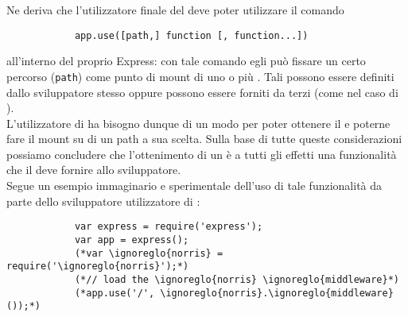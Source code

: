 		Ne deriva che l'utilizzatore finale del  deve poter utilizzare il comando
		\begin{lstlisting}
			app.use([path,] function [, function...])
		\end{lstlisting}
		all'interno del proprio  Express: con tale comando egli può fissare un certo percorso (\texttt{path}) come punto di mount di uno o più . Tali  possono essere definiti dallo sviluppatore stesso oppure possono essere forniti da terzi (come nel caso di ).\\
		L'utilizzatore di  ha bisogno dunque di un modo per poter ottenere il   e poterne fare il mount su di un path a sua scelta. Sulla base di tutte queste considerazioni possiamo concludere che l'ottenimento di un  è a tutti gli effetti una funzionalità che il   deve fornire allo sviluppatore.\\
		Segue un esempio immaginario e sperimentale dell'uso di tale funzionalità da parte dello sviluppatore utilizzatore di :
		\begin{lstlisting}
			var express = require('express');
			var app = express();
			(*var \ignoreglo{norris} = require('\ignoreglo{norris}');*)
			(*// load the \ignoreglo{norris} \ignoreglo{middleware}*)
			(*app.use('/', \ignoreglo{norris}.\ignoreglo{middleware}());*)
		\end{lstlisting}

